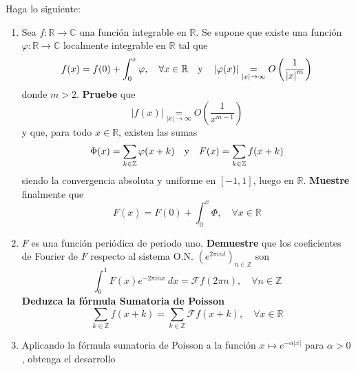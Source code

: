 \documentclass[12pt]{report}
\theoremstyle{largebreak}
\newcommand\abs[1]{\ensuremath{\left|#1\right|}}
\newcommand\cf[3]{\ensuremath{#1:#2\rightarrow#3}}
\newcommand{\fou}[1]{\ensuremath{\mathcal{F}#1}}
\begin{document}
    \begin{excer}
        Haga lo siguiente:
        \begin{enumerate}
            \item Sea $\cf{f}{\mathbb{R}}{\mathbb{C}}$ una función integrable en $\mathbb{R}$. Se supone que existe una función $\cf{\varphi}{\mathbb{R}}{\mathbb{C}}$ localmente integrable en $\mathbb{R}$ tal que
            \begin{equation*}
                f(x)=f(0)+\int_0^{x}\varphi,\quad\forall x\in\mathbb{R}\quad\textup{y}\quad\abs{\varphi(x)}\underset{\abs{x}\rightarrow\infty}{=}O\left(\frac{1}{\abs{x}^m}\right)
            \end{equation*}
            donde $m>2$. \textbf{Pruebe} que
            \begin{equation*}
                \abs{f(x)}\underset{\abs{x}\rightarrow\infty}{=}O\left(\frac{1}{x^{ m-1}}\right)
            \end{equation*}
            y que, para todo $x\in\mathbb{R}$, existen las sumas
            \begin{equation*}
                \Phi(x)=\sum_{k\in\mathbb{Z}}\varphi(x+k)\quad\textup{y}\quad F(x)=\sum_{ k\in\mathbb{Z}}f(x+k)
            \end{equation*}
            siendo la convergencia absoluta y uniforme en $[-1,1]$, luego en $\mathbb{R}$. \textbf{Muestre} finalmente que
            \begin{equation*}
                F(x)=F(0)+\int_0^x\Phi,\quad\forall x\in\mathbb{R}
            \end{equation*}
            \item $F$ es una función periódica de periodo uno. \textbf{Demuestre} que los coeficientes de Fourier de $F$ respecto al sistema O.N. $\left(e^{2\pi int} \right)_{n\in\mathbb{Z}}$ son
            \begin{equation*}
                \int_0^1 F(x)e^{ -2\pi inx}\:dx=\fou{f}(2\pi n),\quad\forall n\in\mathbb{Z}
            \end{equation*}
            \textbf{Deduzca la fórmula Sumatoria de Poisson}
            \begin{equation*}
                \sum_{ k\in\mathbb{Z}}f(x+k)=\sum_{ k\in\mathbb{Z}}\fou{f}(x+k),\quad\forall x\in\mathbb{R}
            \end{equation*}
            \item Aplicando la fórmula sumatoria de Poisson a la función $x\mapsto e^{-\alpha\abs{x}}$ para $\alpha>0$, obtenga el desarrollo
            \begin{equation*}

\end{equation*}
\end{enumerate}
\end{excer}
\end{document}

